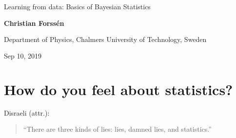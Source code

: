 \documentclass[%
oneside,                 %
final,                   %
10pt]{article}
\newenvironment{block_mdfboxadmon}[1][]{
\begin{block_mdfboxmdframed}[frametitle=#1]
}
{
\end{block_mdfboxmdframed}
}
\begin{document}

\newcommand{\exercisesection}[1]{\subsection*{#1}}







\thispagestyle{empty}

\begin{center}
{\LARGE\bf
\begin{spacing}{1.25}
Learning from data: Basics of Bayesian Statistics
\end{spacing}
}
\end{center}


\begin{center}
{\bf Christian Forssén}
\end{center}

    \begin{center}
\centerline{{\small Department of Physics, Chalmers University of Technology, Sweden}}
\end{center}
    

\begin{center}
Sep 10, 2019
\end{center}

\vspace{1cm}


\section{How do you feel about statistics?}

\begin{block_mdfboxadmon}[]
Disraeli (attr.): 

\begin{quote}
“There are three kinds of lies: lies, damned lies, and statistics.”
\end{quote}
\end{block_mdfboxadmon} %
\end{document}
